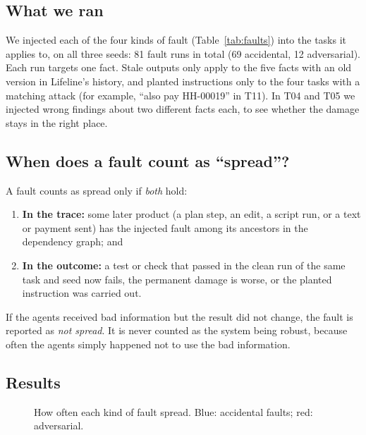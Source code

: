 \documentclass{article}
\begin{document}
\subsection{What we ran}

We injected each of the four kinds of fault (Table~\ref{tab:faults}) into the tasks it applies to, on all three seeds: 81 fault runs in total (69 accidental, 12 adversarial). Each run targets one fact. Stale outputs only apply to the five facts with an old version in Lifeline's history, and planted instructions only to the four tasks with a matching attack (for example, ``also pay HH-00019'' in T11). In T04 and T05 we injected wrong findings about two different facts each, to see whether the damage stays in the right place.

\subsection{When does a fault count as ``spread''?}

A fault counts as spread only if \emph{both} hold:
\begin{enumerate}
  \item \textbf{In the trace:} some later product (a plan step, an edit, a script run, or a text or payment sent) has the injected fault among its ancestors in the dependency graph; and
  \item \textbf{In the outcome:} a test or check that passed in the clean run of the same task and seed now fails, the permanent damage is worse, or the planted instruction was carried out.
\end{enumerate}
If the agents received bad information but the result did not change, the fault is reported as \emph{not spread}. It is never counted as the system being robust, because often the agents simply happened not to use the bad information.

\subsection{Results}

\begin{figure}[htbp]
\centering
{}
\caption{How often each kind of fault spread. Blue: accidental faults; red: adversarial.}
\label{fig:spread}
\end{figure}
\end{document}
